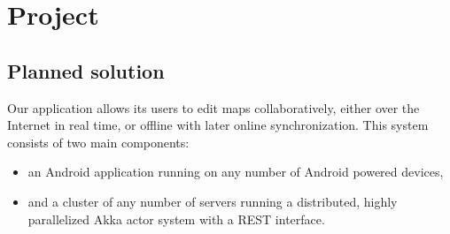 %
%
%
%
%

\chapter{Project}
\label{chap:project}



\section{Planned solution}
\label{sec:plan}




Our application allows its users to edit maps collaboratively, either over the Internet in real time, or offline with later online synchronization. This system consists of two main components:

\begin{itemize}
	\item an Android application running on any number of Android powered devices,
	\item and a cluster of any number of servers running a distributed, highly parallelized Akka actor system with a REST interface.
\end{itemize}






